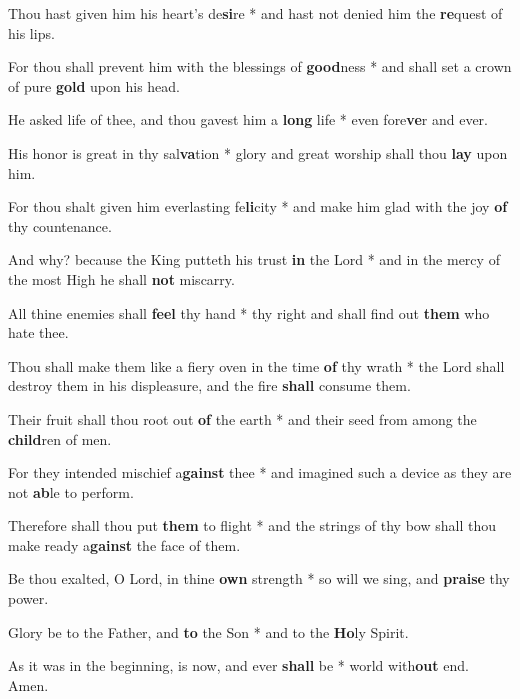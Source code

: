 \begin{multicols}{2}
	Thou hast given him his heart's de\textbf{si}re * and hast not denied him the \textbf{re}quest of his lips.
	
	For thou shall prevent him with the blessings of \textbf{good}ness * and shall set a crown of pure \textbf{gold} upon his head.
	
	He asked life of thee, and thou gavest him a \textbf{long} life * even fore\textbf{ve}r and ever.
	
	His honor is great in thy sal\textbf{va}tion * glory and great worship shall thou \textbf{lay} upon him.
	
	For thou shalt given him everlasting fe\textbf{li}city * and make him glad with the joy \textbf{of} thy countenance.
	
	And why? because the King putteth his trust \textbf{in} the Lord * and in the mercy of the most High he shall \textbf{not} miscarry.
	
	All thine enemies shall \textbf{feel} thy hand * thy right and shall find out \textbf{them} who hate thee.
	
	Thou shall make them like a fiery oven in the time \textbf{of} thy wrath * the Lord shall destroy them in his displeasure, and the fire \textbf{shall} consume them.
	
	Their fruit shall thou root out \textbf{of} the earth * and their seed from among the \textbf{child}ren of men.
	
	For they intended mischief a\textbf{gainst} thee * and imagined such a device as they are not \textbf{ab}le to perform.
	
	Therefore shall thou put \textbf{them} to flight * and the strings of thy bow shall thou make ready a\textbf{gainst} the face of them.
	
	Be thou exalted, O Lord, in thine \textbf{own} strength * so will we sing, and \textbf{praise} thy power.
	
	Glory be to the Father, and \textbf{to} the Son * and to the \textbf{Ho}ly Spirit.
	
	As it was in the beginning, is now, and ever \textbf{shall} be * world with\textbf{out} end. Amen.
\end{multicols}